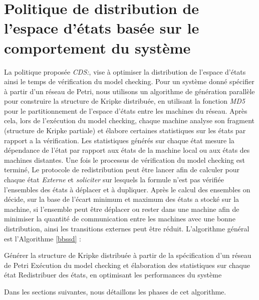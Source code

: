 
\section{Politique de distribution de l’espace d’états basée sur le	comportement du système}
 
La politique proposée \emph{CDS{}:\CDSDef{}}, vise à optimiser la distribution de l’espace d’états ainsi le temps de vérification du model checking. Pour un système donné spécifier à partir d'un réseau de Petri, nous utilisons un algorithme de génération parallèle pour construire la structure de Kripke distribuée, en utilisant la fonction \emph{MD5} pour le partitionnement de l’espace d’états entre les machines du réseau. Après cela, lors de l'exécution du model checking, chaque machine analyse son fragment (structure de Kripke partiale) et élabore certaines statistiques sur les états par rapport a la vérification. Les statistiques  générés sur chaque état mesure la dépendance de l'état par rapport aux états de la machine local ou aux états des machines distantes. Une fois le processus de vérification du model checking est terminé, Le protocole de redistribution peut être lancer afin de calculer pour chaque état \emph{Externe} et \emph{soliciter} sur lesquels la formule n'est pas vérifiée l'ensembles des états à déplacer et à dupliquer. Après le calcul des ensembles on décide, sur la base de l'écart minimum et maximum des états a stocké sur la machine, si l'ensemble peut être déplacer ou rester dans une machine afin de minimiser la quantité de communication entre les machines avec une bonne distribution, ainsi les transitions externes peut être réduit.
L’algorithme général est l'Algorithme \ref{bbssd} :\\
\begin{algorithm}[H]\label{bbssd}
	\SetAlgoLined
	 Générer la structure de Kripke distribuée à partir de la spécification d'un réseau de Petri\;
	 Exécution du model checking et élaboration des statistiques sur chaque état\;
	 Redistribuer des états, en optimisant les performances du système\;	  
	\caption{\CDS{}}
\end{algorithm}

Dans les sections suivantes, nous détaillons les phases de cet algorithme.

